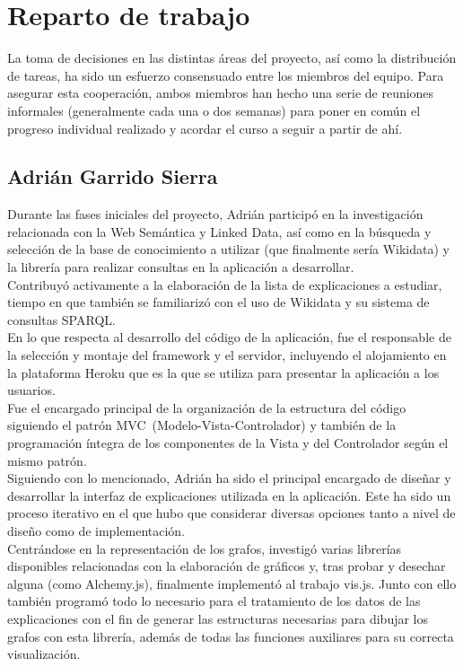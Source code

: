 \chapter{Reparto de trabajo}
\label{Appendix:Key1}

La toma de decisiones en las distintas áreas del proyecto, así como la distribución de tareas, ha sido un esfuerzo consensuado entre los miembros del equipo. Para asegurar esta cooperación, ambos miembros han hecho una serie de reuniones informales (generalmente cada una o dos semanas) para poner en común el progreso individual realizado y acordar el curso a seguir a partir de ahí.

\section{Adrián Garrido Sierra}

Durante las fases iniciales del proyecto, Adrián participó en la investigación relacionada con la Web Semántica y Linked Data, así como en la búsqueda y selección de la base de conocimiento a utilizar (que finalmente sería Wikidata) y la librería para realizar consultas en la aplicación a desarrollar. \\

Contribuyó activamente a la elaboración de la lista de explicaciones a estudiar, tiempo en que también se familiarizó con el uso de Wikidata y su sistema de consultas SPARQL. \\

En lo que respecta al desarrollo del código de la aplicación, fue el responsable de la selección y montaje del framework y el servidor, incluyendo el alojamiento en la plataforma Heroku que es la que se utiliza para presentar la aplicación a los usuarios. \\

Fue el encargado principal de la organización de la estructura del código siguiendo el patrón MVC~(Modelo-Vista-Controlador) y también de la programación íntegra de los componentes de la Vista y del Controlador según el mismo patrón. \\

Siguiendo con lo mencionado, Adrián ha sido el principal encargado de diseñar y desarrollar la interfaz de explicaciones utilizada en la aplicación. Este ha sido un proceso iterativo en el que hubo que considerar diversas opciones tanto a nivel de diseño como de implementación. \\

Centrándose en la representación de los grafos, investigó varias librerías disponibles relacionadas con la elaboración de gráficos y, tras probar y desechar alguna (como Alchemy.js), finalmente implementó al trabajo vis.js. Junto con ello también programó todo lo necesario para el tratamiento de los datos de las explicaciones con el fin de generar las estructuras necesarias para dibujar los grafos con esta librería, además de todas las funciones auxiliares para su correcta visualización. \\

